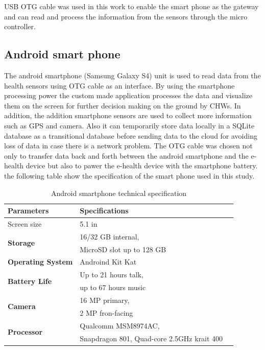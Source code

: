 USB OTG cable was used in this work to enable the smart phone as the gateway and can read and process the information from the sensors through the micro controller.

\subsection{Android smart phone}

The android smartphone (Samsung Galaxy S4) unit is used to read data from the health sensors using OTG cable as an interface. By using the smartphone processing power the custom made application processes the data and visualize them on the screen for further decision making on the ground by CHWs. In addition, the addition smartphone sensors are used to collect more information such as GPS and camera. Also it can temporarily store data locally in a SQLite database as a transitional database before sending data to the cloud for avoiding loss of data in case there is a network problem. The OTG cable was chosen not only to transfer data back and forth between the android smartphone and the e-health device but also to pawer the e-health device with the smartphone battery. the following table show the specification of the smart phone used in this study.

\begin{table}[H]
\begin{center}
    \begin{tabular}{ |l|l|l| }
\hline
{\bfseries Parameters} & {\bfseries Specifications} \\ \hline
Screen size & 5.1 in \\ \hline
\multirow{2}{*}{\bfseries Storage} 
 & 16/32 GB internal,  \\
 & MicroSD slot up to 128 GB\\
\hline
\bfseries Operating System & Androind Kit Kat\\ \hline
\multirow{2}{*}{\bfseries Battery Life} 
 & Up to 21 hours talk,  \\
 & up to 67 hours music\\
\hline
\multirow{2}{*}{\bfseries Camera} 
 & 16 MP primary,  \\
 & 2 MP fron-facing\\
\hline
\multirow{2}{*}{\bfseries Processor} 
 & Qualcomm MSM8974AC,  \\
 & Snapdragon 801, Quad-core 2.5GHz krait 400\\
\hline
\end{tabular}
\end{center}
\caption{Android smartphone technical specification}\label{Smart phone}
\end{table}

